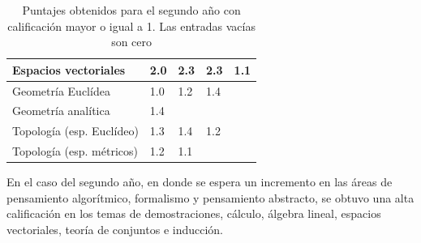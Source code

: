 \begin{refsection}
\begin{table}[H]
\begin{center}
\begin{tabular}{|l|c|c|c|c|}
Espacios vectoriales & \multicolumn{1}{l|}{2.0} & \multicolumn{1}{l|}{2.3} & \multicolumn{1}{l|}{2.3} & \multicolumn{1}{l|}{1.1} \\ \hline
Geometría Euclídea & \multicolumn{1}{l|}{1.0} & \multicolumn{1}{l|}{1.2} & \multicolumn{1}{l|}{1.4} & \multicolumn{1}{l|}{} \\ \hline
Geometría analítica & \multicolumn{1}{l|}{1.4} & \multicolumn{1}{l|}{} & \multicolumn{1}{l|}{} & \multicolumn{1}{l|}{} \\ \hline
Topología (esp. Euclídeo) & \multicolumn{1}{l|}{1.3} & \multicolumn{1}{l|}{1.4} & \multicolumn{1}{l|}{1.2} & \multicolumn{1}{l|}{} \\ \hline
Topología (esp. métricos) & \multicolumn{1}{l|}{1.2} & \multicolumn{1}{l|}{1.1} & \multicolumn{1}{l|}{} & \multicolumn{1}{l|}{} \\ \hline
\end{tabular}
\end{center}
\caption{Puntajes obtenidos para el segundo año con calificación mayor o igual a 1. Las entradas vacías son cero} \label{Segundoanno}
\end{table}

En el caso del segundo año, en donde se espera un incremento en las áreas de pensamiento algorítmico, formalismo y pensamiento abstracto, se obtuvo una alta calificación en los temas de demostraciones, cálculo, álgebra lineal, espacios vectoriales, teoría de conjuntos e inducción.


\end{refsection}
